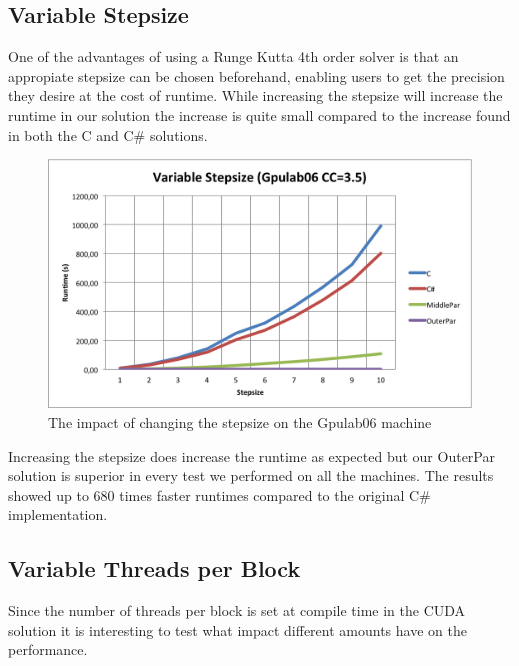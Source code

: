 \subsection{Variable Stepsize}
One of the advantages of using a Runge Kutta 4th order solver is that an appropiate stepsize can be chosen beforehand, enabling users to get the precision they desire at the cost of runtime. While increasing the stepsize will increase the runtime in our solution the increase is quite small compared to the increase found in both the C and C\# solutions.

\begin{figure}
\begin{center}
	\includegraphics[width=\textwidth]{img/Gpulab-stepsize35.png}
\end{center}
\caption{The impact of changing the stepsize on the Gpulab06 machine}
\end{figure}

Increasing the stepsize does increase the runtime as expected but our OuterPar solution is superior in every test we performed on all the machines. The results showed up to 680 times faster runtimes compared to the original C\# implementation.

\subsection{Variable Threads per Block}
Since the number of threads per block is set at compile time in the CUDA solution it is interesting to test what impact different amounts have on the performance.

